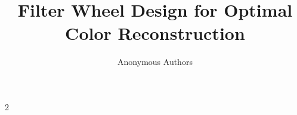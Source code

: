 \documentclass{iopconfser}
\begin{document}
\title{Filter Wheel Design for Optimal Color Reconstruction}

\author{Anonymous Authors}





\begin{multicols}{2}





\end{multicols}

\newpage

 

%
\end{document}
